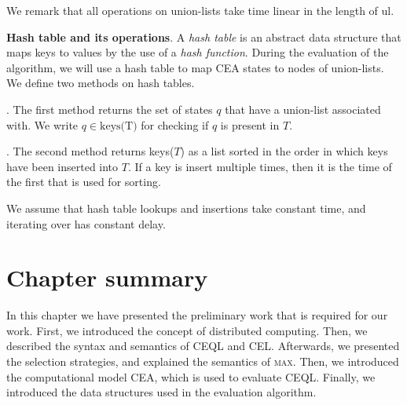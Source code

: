We remark that all operations on union-lists take time linear in the length of \textrm{ul}.

\textbf{Hash table and its operations}. A \emph{hash table} is an abstract data structure that maps keys to values by the use of a \emph{hash function}. During the evaluation of the algorithm, we will use a hash table to map CEA states to nodes of union-lists. We define two methods on hash tables.

. The first method returns the set of states $q$ that have a union-list associated with. We write $q \in \text{keys(T)}$ for checking if $q$ is present in $T$.

. The second method returns keys($T$) as a list sorted in the order in which keys have been inserted into $T$. If a key is insert multiple times, then it is the time of the first that is used for sorting.

We assume that hash table lookups and insertions take constant time, and iterating over has constant delay.


\section{Chapter summary}

In this chapter we have presented the preliminary work that is required for our work. First, we introduced the concept of distributed computing. Then, we described the syntax and semantics of CEQL and CEL. Afterwards, we presented the selection strategies, and explained the semantics of \textsc{max}. Then, we introduced the computational model CEA, which is used to evaluate CEQL. Finally, we introduced the data structures used in the evaluation algorithm.
